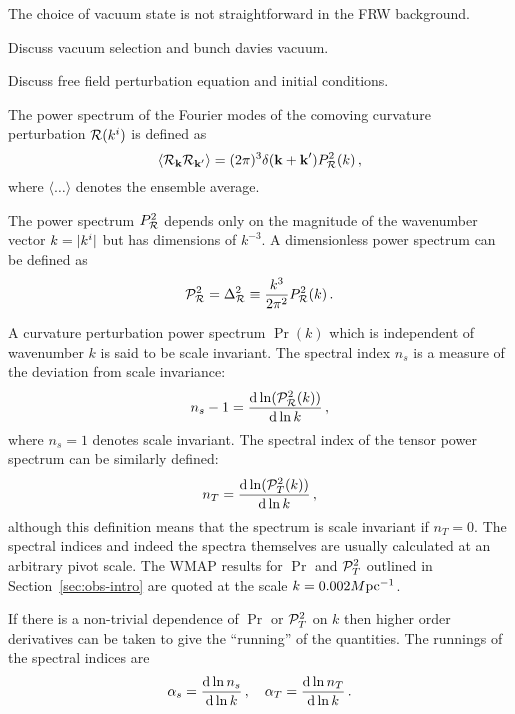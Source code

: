 The choice of vacuum state is not straightforward in the FRW background. 


Discuss vacuum selection and bunch davies vacuum.

Discuss free field perturbation equation and initial conditions.




The power spectrum of the
Fourier modes of the comoving curvature perturbation $\mathcal{R}(k^i)$ is defined as
% 
\begin{equation}
 \label{eq:Prdefn-intro}
 \langle \mathcal{R}_{\textbf{k}} \mathcal{R}_{\textbf{k}'} \rangle 
   = (2\pi)^3 \delta(\textbf{k} + \textbf{k}') P_{\mathcal{R}}^2 (k)\,,
\end{equation}
% 
where $\langle \ldots \rangle$ denotes the ensemble average.



The power spectrum $P_{\mathcal{R}}^2$ depends only on the magnitude of the wavenumber
vector
$k=|k^i|$ but has dimensions of $k^{-3}$. A dimensionless power spectrum can be
defined as
\begin{equation}
 \label{eq:curlPrdefn-intro}
 \mathcal{P}_{\mathcal{R}}^2 = \Delta^2_{\mathcal{R}} \equiv \frac{k^3}{2\pi^2} P_{\mathcal{R}}^2(k)\,.
\end{equation}
 

A curvature perturbation power spectrum $\Pr(k)$ which is independent of
wavenumber $k$ is said to be scale invariant. The spectral index $n_s$ is a
measure of the deviation from scale invariance:
% 
\begin{equation}
\label{eq:nsdefn-intro}
 n_s -1 = \frac{\mathrm{d} \ln (\mathcal{P}_{\mathcal{R}}^2 (k))}{\mathrm{d} \ln k}\,,
\end{equation}
% 
where $n_s=1$ denotes scale invariant. The spectral index of
the tensor power spectrum can be similarly defined:
% 
\begin{equation}
\label{eq:ntdefn-intro}
 n_T = \frac{\mathrm{d} \ln(\mathcal{P}_T^2(k))}{\mathrm{d} \ln k}\,,
\end{equation}
although this definition means that the spectrum is scale invariant if
$n_T=0$.
The spectral indices and indeed the spectra themselves are usually calculated
at an arbitrary pivot scale. The WMAP results for $\Pr$ and $\mathcal{P}_T^2$ outlined in
Section~\ref{sec:obs-intro} are quoted at the scale $k=0.002M \mathrm{pc}^{-1}$.


If there is a non-trivial dependence of $\Pr$ or $\mathcal{P}_T^2$ on $k$ then higher order
derivatives can be taken to give the ``running'' of the quantities. The runnings
of the spectral indices are
% 
\begin{equation}
\label{eq:runningsdefn-intro}
 \alpha_s = \frac{\mathrm{d} \ln n_s}{\mathrm{d} \ln k}\,, \quad 
  \alpha_T = \frac{\mathrm{d} \ln n_T}{\mathrm{d} \ln k}\,.
\end{equation}


